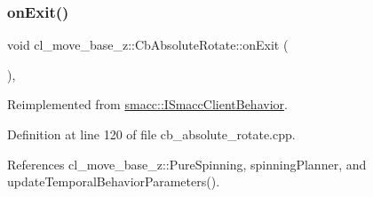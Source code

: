 \mbox{\label{classcl__move__base__z_1_1CbAbsoluteRotate_a0e362b8e9f0d7de5aeee183ba4031437}} 
\subsubsection{\texorpdfstring{on\+Exit()}{onExit()}}
{\footnotesize\ttfamily void cl\+\_\+move\+\_\+base\+\_\+z\+::\+Cb\+Absolute\+Rotate\+::on\+Exit (\begin{DoxyParamCaption}{ }\end{DoxyParamCaption})\hspace{0.3cm}{\ttfamily [override]}, {\ttfamily [virtual]}}



Reimplemented from \hyperlink{classsmacc_1_1ISmaccClientBehavior_a36bf771905e3bf750909a15e4215a9b3}{smacc\+::\+I\+Smacc\+Client\+Behavior}.



Definition at line 120 of file cb\+\_\+absolute\+\_\+rotate.\+cpp.



References cl\+\_\+move\+\_\+base\+\_\+z\+::\+Pure\+Spinning, spinning\+Planner, and update\+Temporal\+Behavior\+Parameters().


